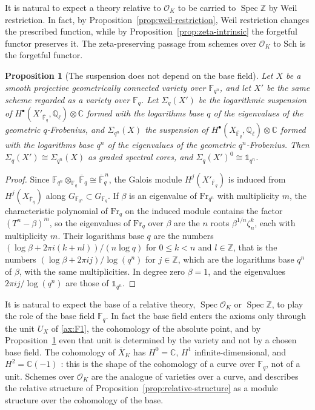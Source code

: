 \documentclass[11pt]{amsart}
\theoremstyle{plain}
\newtheorem{proposition}[theorem]{Proposition}
\theoremstyle{definition}
\theoremstyle{remark}
\numberwithin{equation}{section}
\newcommand{\C}{\mathbb{C}}
\newcommand{\Q}{\mathbb{Q}}
\newcommand{\Z}{\mathbb{Z}}
\newcommand{\F}{\mathbb{F}}
\newcommand{\Xbar}{\overline{X}}
\newcommand{\cO}{\mathcal{O}}
\newcommand{\Schbar}{\overline{\mathrm{Sch}}}
\DeclareMathOperator{\Spec}{Spec}
\begin{document}
It is natural to expect a theory relative to $\cO_K$ to be carried to
$\Spec\Z$ by Weil restriction. In fact, by
Proposition~\ref{prop:weil-restriction}, Weil restriction changes the
prescribed function, while by Proposition~\ref{prop:zeta-intrinsic}
the forgetful functor preserves it. The zeta-preserving passage from
schemes over $\cO_K$ to $\Schbar$ is the forgetful functor.

\begin{proposition}[The suspension does not depend on the base field]
\label{prop:suspension-base}
Let $X$ be a smooth projective geometrically connected variety over
$\F_{q^n}$, and let $X'$ be the same scheme regarded as a variety over
$\F_q$. Let $\Sigma_q(X')$ be the logarithmic suspension of
$H^\bullet(X'_{\overline{\F}_q},\Q_\ell)\otimes\C$ formed with the
logarithms base $q$ of the eigenvalues of the geometric
$q$-Frobenius, and $\Sigma_{q^n}(X)$ the suspension of
$H^\bullet(X_{\overline{\F}_q},\Q_\ell)\otimes\C$ formed with the
logarithms base $q^n$ of the eigenvalues of the geometric
$q^n$-Frobenius. Then $\Sigma_q(X')\cong\Sigma_{q^n}(X)$ as graded
spectral cores, and $\Sigma_q(X')^0\cong\mathbb 1_{q^n}$.
\end{proposition}

\begin{proof}
Since $\F_{q^n}\otimes_{\F_q}\overline{\F}_q\cong\overline{\F}_q^{\,n}$,
the Galois module $H^j(X'_{\overline{\F}_q})$ is induced from
$H^j(X_{\overline{\F}_q})$ along $G_{\F_{q^n}}\subset G_{\F_q}$. If
$\beta$ is an eigenvalue of $\mathrm{Fr}_{q^n}$ with multiplicity $m$,
the characteristic polynomial of $\mathrm{Fr}_q$ on the induced module
contains the factor $(T^n-\beta)^m$, so the eigenvalues of
$\mathrm{Fr}_q$ over $\beta$ are the $n$ roots $\beta^{1/n}\zeta_n^k$,
each with multiplicity $m$. Their logarithms base $q$ are the numbers
$(\log\beta+2\pi i(k+nl))/(n\log q)$ for $0\le k<n$ and $l\in\Z$,
that is the numbers $(\log\beta+2\pi ij)/\log(q^n)$ for $j\in\Z$,
which are the logarithms base $q^n$ of $\beta$, with the same
multiplicities. In degree zero $\beta=1$, and the eigenvalues
$2\pi ij/\log(q^n)$ are those of $\mathbb 1_{q^n}$.
\end{proof}

It is natural to expect the base of a relative theory, $\Spec\cO_K$ or
$\Spec\Z$, to play the role of the base field $\F_q$. In fact the base
field enters the axioms only through the unit $U_X$ of \ref{ax:F1},
the cohomology of the absolute point, and by
Proposition~\ref{prop:suspension-base} even that unit is determined by
the variety and not by a chosen base field. The cohomology of $\Xbar_K$
has $H^0=\C$, $H^1$ infinite-dimensional, and $H^2=\C(-1)$
\cite[(3), p.~168]{Deninger1998Analogies}: this is the shape of the
cohomology of a curve over $\F_q$, not of a unit. Schemes over
$\cO_K$ are the analogue of varieties over a curve, and
\cite[p.~172]{Deninger1998Analogies} describes the relative structure
of Proposition~\ref{prop:relative-structure} as a module structure
over the cohomology of the base.
\end{document}
